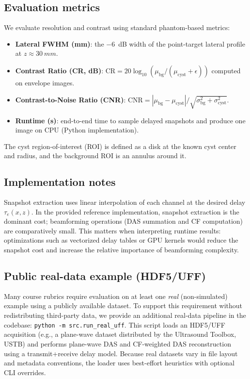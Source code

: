 \documentclass[conference]{IEEEtran}
\begin{document}
\subsection{Evaluation metrics}
We evaluate resolution and contrast using standard phantom-based metrics:
\begin{itemize}
    \item \textbf{Lateral FWHM (mm)}: the $-6$~dB width of the point-target lateral profile at $z\approx \SI{30}{mm}$.
    \item \textbf{Contrast Ratio (CR, dB)}: $\mathrm{CR}=20\log_{10}\!\left(\mu_{\mathrm{bg}}/(\mu_{\mathrm{cyst}}+\epsilon)\right)$ computed on envelope images.
    \item \textbf{Contrast-to-Noise Ratio (CNR)}: $\mathrm{CNR}=|\mu_{\mathrm{bg}}-\mu_{\mathrm{cyst}}|/\sqrt{\sigma_{\mathrm{bg}}^2+\sigma_{\mathrm{cyst}}^2}$.
    \item \textbf{Runtime (s)}: end-to-end time to sample delayed snapshots and produce one image on CPU (Python implementation).
\end{itemize}
The cyst region-of-interest (ROI) is defined as a disk at the known cyst center and radius, and the background ROI is an annulus around it.

\subsection{Implementation notes}
Snapshot extraction uses linear interpolation of each channel at the desired delay $\tau_e(x,z)$. In the provided reference implementation, snapshot extraction is the dominant cost; beamforming operations (DAS summation and CF computation) are comparatively small. This matters when interpreting runtime results: optimizations such as vectorized delay tables or GPU kernels would reduce the snapshot cost and increase the relative importance of beamforming complexity.

\subsection{Public real-data example (HDF5/UFF)}
Many course rubrics require evaluation on at least one \emph{real} (non-simulated) example using a publicly available dataset. To support this requirement without redistributing third-party data, we provide an additional real-data pipeline in the codebase:
\texttt{python -m src.run\_real\_uff}. This script loads an HDF5/UFF acquisition (e.g., a plane-wave dataset distributed by the Ultrasound Toolbox, USTB) and performs plane-wave DAS and CF-weighted DAS reconstruction using a transmit+receive delay model. Because real datasets vary in file layout and metadata conventions, the loader uses best-effort heuristics with optional CLI overrides.
\end{document}
